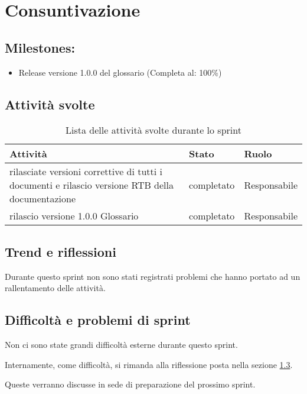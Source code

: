 \section{Consuntivazione}

\subsection{Milestones:}
\begin{itemize}
    \item Release versione 1.0.0 del glossario (Completa al: 100\%)
\end{itemize}

\subsection{Attività svolte}

\begin{table}[H]
    \begin{xltabular}{\textwidth}{X l l}

         \textbf{Attività} & \textbf{Stato} & \textbf{Ruolo}\\
        \endhead
        \hline
        rilasciate versioni correttive di tutti i documenti e rilascio versione RTB della documentazione & completato & Responsabile \\
        rilascio versione 1.0.0 Glossario & completato & Responsabile \\
    \end{xltabular}
    \caption{Lista delle attività svolte durante lo sprint}
\end{table}

\subsection{Trend e riflessioni}\label{subsec:trend}

Durante questo sprint non sono stati registrati problemi che hanno portato ad un rallentamento delle attività.

\subsection{Difficoltà e problemi di sprint}

Non ci sono state grandi difficoltà esterne durante questo sprint.

Internamente, come difficoltà, si rimanda alla riflessione posta nella sezione \ref{subsec:trend}.

Queste verranno discusse in sede di preparazione del prossimo sprint.
